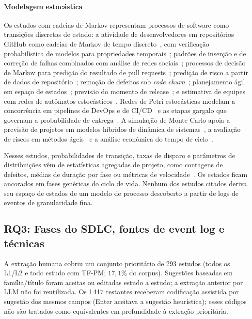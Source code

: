 \documentclass[preprint,12pt,authoryear=false]{elsarticle}
\newcommand{\PM}{TF-PM}
\begin{document}
\paragraph{Modelagem estocástica}
Os estudos com cadeias de Markov representam processos de software como transições discretas de estado: a atividade de desenvolvedores em repositórios GitHub como cadeias de Markov de tempo discreto~\cite{jo2023}, com verificação probabilística de modelos para propriedades temporais~\cite{jo2024}; padrões de inserção e de correção de falhas combinados com análise de redes sociais~\cite{ortu2023}; processos de decisão de Markov para predição do resultado de pull requests~\cite{joshi2024}; predição de risco a partir de dados de repositório~\cite{jeon2015}; remoção de defeitos sob \emph{code churn}~\cite{tian2005}; planejamento ágil em espaço de estados~\cite{tyagi2021}; previsão do momento de release~\cite{washizaki2015}; e estimativa de equipes com redes de autômatos estocásticos~\cite{massitela2018}. Redes de Petri estocásticas modelam a concorrência em pipelines de DevOps e de CI/CD~\cite{mesmia2021} e as etapas gargalo que governam a probabilidade de entrega~\cite{bhadra2022,bhadra2023}. A simulação de Monte Carlo apoia a previsão de projetos em modelos híbridos de dinâmica de sistemas~\cite{li2020}, a avaliação de riscos em métodos ágeis~\cite{lunesu2021} e a análise econômica do tempo de ciclo~\cite{magennis2015}.

Nesses estudos, probabilidades de transição, taxas de disparo e parâmetros de distribuições vêm de estatísticas agregadas de projeto, como contagens de defeitos, médias de duração por fase ou métricas de velocidade~\cite{nafreen2020,bhadra2022,li2020}. Os estados ficam ancorados em fases genéricas do ciclo de vida. Nenhum dos estudos citados deriva seu espaço de estados de um modelo de processo descoberto a partir de logs de eventos de granularidade fina.

\subsection{RQ3: Fases do SDLC, fontes de event log e técnicas}\label{sec:rq3}

A extração humana cobriu um conjunto prioritário de 293 estudos (todos os L1/L2 e todo estudo com \PM{}; $17,1\%$ do corpus). Sugestões baseadas em família/título foram aceitas ou editadas estudo a estudo; a extração anterior por LLM não foi reutilizada. Os 1\,417 restantes receberam codificação assistida por sugestão dos mesmos campos (Enter aceitava a sugestão heurística); esses códigos não são tratados como equivalentes em profundidade à extração prioritária.
\end{document}
